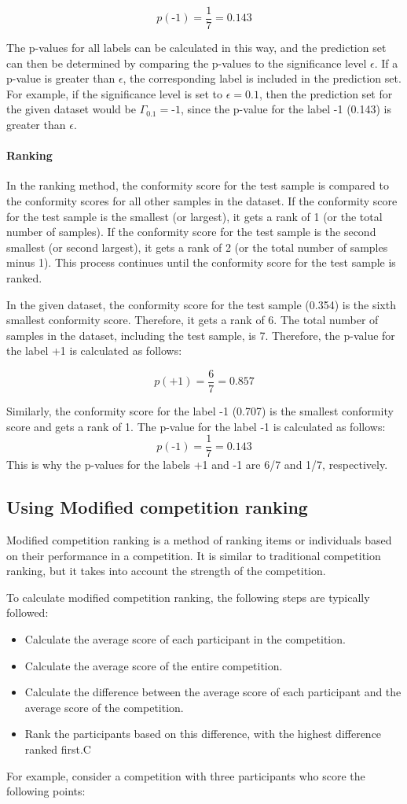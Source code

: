 $$ p(\text{-1}) = \frac{1}{7} = 0.143 $$

The p-values for all labels can be calculated in this way, and the prediction set can then be determined by comparing the p-values to the significance level $\epsilon$. If a p-value is greater than $\epsilon$, the corresponding label is included in the prediction set. For example, if the significance level is set to $\epsilon = 0.1$, then the prediction set for the given dataset would be $\Gamma_{0.1} = {\text{-1}}$, since the p-value for the label -1 (0.143) is greater than $\epsilon$.

\paragraph{Ranking}
In the ranking method, the conformity score for the test sample is compared to the conformity scores for all other samples in the dataset. If the conformity score for the test sample is the smallest (or largest), it gets a rank of 1 (or the total number of samples). If the conformity score for the test sample is the second smallest (or second largest), it gets a rank of 2 (or the total number of samples minus 1). This process continues until the conformity score for the test sample is ranked.

In the given dataset, the conformity score for the test sample (0.354) is the sixth smallest conformity score. Therefore, it gets a rank of 6. The total number of samples in the dataset, including the test sample, is 7. Therefore, the p-value for the label +1 is calculated as follows:

$$ p(\text{+1}) = \frac{6}{7} = 0.857 $$

Similarly, the conformity score for the label -1 (0.707) is the smallest conformity score and gets a rank of 1. The p-value for the label -1 is calculated as follows:
$$ p(\text{-1}) = \frac{1}{7} = 0.143 $$
This is why the p-values for the labels +1 and -1 are 6/7 and 1/7, respectively.

\subsection{Using Modified competition ranking}
Modified competition ranking is a method of ranking items or individuals based on their performance in a competition. It is similar to traditional competition ranking, but it takes into account the strength of the competition.

To calculate modified competition ranking, the following steps are typically followed:
\begin{itemize}
	\item Calculate the average score of each participant in the competition.
	\item Calculate the average score of the entire competition.
	\item Calculate the difference between the average score of each participant and the average score of the competition.
	\item Rank the participants based on this difference, with the highest difference ranked first.C
\end{itemize}
For example, consider a competition with three participants who score the following points:

